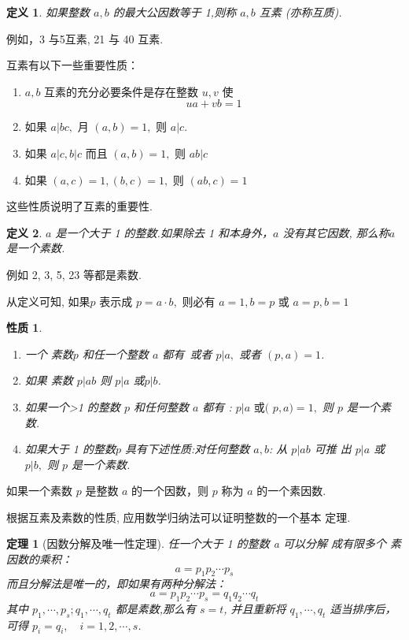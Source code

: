 \documentclass[13pt,fontset=mac]{ctexbeamer}
\newtheorem{thm}{定理}
\newtheorem*{defi}{定义}
\newtheorem*{prop}{性质}
\begin{document}
\begin{frame}
\begin{defi}
	如果整数 $a, b$ 的最大公因数等于 1,则称 $a, b$ \alert{互素} (亦称互质).
\end{defi}
例如，3 与5互素, 21 与 40 互素.

互素有以下一些重要性质：
\begin{enumerate}
\item $a ,b$ 互素的充分必要条件是存在整数 $u, v$ 使
\[
u a+v b=1
\]
\item 如果 $a | b c,$ 月 $(a, b)=1,$ 则 $a | c$.
\item 如果 $a|c, b| c$ 而且 $(a, b)=1,$ 则 $a b | c$
\item 如果 $(a, c)=1,(b, c)=1,$ 则 $(a b, c)=1$
\end{enumerate}
这些性质说明了互素的重要性.
\end{frame}



 \begin{frame}


\begin{defi}
	$a$ 是一个大于 1 的整数.如果除去 1 和本身外，$a$ 没有其它因数, 那么称$a$是一个\alert{素数}.
\end{defi}
例如 2, 3, 5, 23 等都是素数.

从定义可知, 如果$p$ 表示成 $p=a \cdot b,$ 则必有 $a=1, b=p$ 或 $a=p, b=1$

\begin{prop}
\begin{enumerate}
\item  一个 素数$p$ 和任一个整数 $a$ 都有~或者 $p | a,$ 或者 $(p, a)=1$.
\item 如果 素数 $p | a  b$ 则 $p | a$ 或$p| b$.
\item  如果一个>1 的整数 $p$ 和任何整数 $a$ 都有 : $p | a \text { 或( } p, a)=1,$ 则 $p$
是一个素数.
\item 如果大于 1 的整数$p$ 具有下述性质:对任何整数 $a , b$: 从 $p | a b$ 可推 出 $p | a$ 或 $p | b,$ 则 $p$ 是一个素数.
\end{enumerate}
\end{prop}
如果一个素数  $p$ 是整数 $a$ 的一个因数，则 $p$ 称为 $a$ 的一个素因数.
 \end{frame}


 \begin{frame}
根据互素及素数的性质, 应用数学归纳法可以证明整数的一个基本
定理.
\begin{thm}[因数分解及唯一性定理]
任一个大于 1 的整数 a 可以分解 成有限多个 素因数的乘积：
\[
a=p_{1} p_{2} \cdots p_{s}
\]
而且分解法是唯一的，即如果有两种分解法：
\[
a=p_{1} p_{2} \cdots p_{s}= q_{1} q_{2} \cdots q_{t}
\]
其中 $p_{1}, \cdots, p_{s} ; q_{1}, \cdots, q_{t}$ 都是素数,那么有 $s=t$,  并且重新将 $q_{1}, \cdots, q_{t}$ 适当排序后，可得
$p_{i}=q_{i}, \quad i=1,2, \cdots, s$.
\end{thm}
\end{frame}
\end{document}
